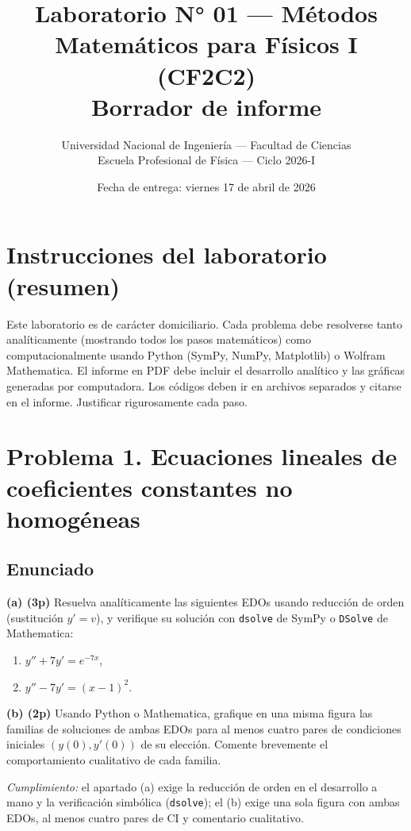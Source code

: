 \documentclass[11pt,a4paper]{article}
\title{Laboratorio N° 01 --- Métodos Matemáticos para Físicos I (CF2C2)\\
\large Borrador de informe}
\author{Universidad Nacional de Ingeniería --- Facultad de Ciencias\\
Escuela Profesional de Física --- Ciclo 2026-I}
\date{Fecha de entrega: viernes 17 de abril de 2026}
\begin{document}
\maketitle

\section*{Instrucciones del laboratorio (resumen)}
Este laboratorio es de carácter domiciliario. Cada problema debe resolverse tanto analíticamente (mostrando todos los pasos matemáticos) como computacionalmente usando Python (SymPy, NumPy, Matplotlib) o Wolfram Mathematica. El informe en PDF debe incluir el desarrollo analítico y las gráficas generadas por computadora. Los códigos deben ir en archivos separados y citarse en el informe. Justificar rigurosamente cada paso.

\vspace{2em}

\section*{Problema 1. Ecuaciones lineales de coeficientes constantes no homogéneas}

\subsection*{Enunciado}
\textbf{(a) (3p)} Resuelva analíticamente las siguientes EDOs usando reducción de orden (sustitución $y' = v$), y verifique su solución con \texttt{dsolve} de SymPy o \texttt{DSolve} de Mathematica:
\begin{enumerate}
  \item[(i)] $y'' + 7y' = e^{-7x}$,
  \item[(ii)] $y'' - 7y' = (x - 1)^2$.
\end{enumerate}

\textbf{(b) (2p)} Usando Python o Mathematica, grafique en una misma figura las familias de soluciones de ambas EDOs para al menos cuatro pares de condiciones iniciales $(y(0), y'(0))$ de su elección. Comente brevemente el comportamiento cualitativo de cada familia.

\noindent\textit{Cumplimiento:} el apartado (a) exige la reducción de orden en el desarrollo a mano y la verificación simbólica (\texttt{dsolve}); el (b) exige una sola figura con ambas EDOs, al menos cuatro pares de CI y comentario cualitativo.
\end{document}
